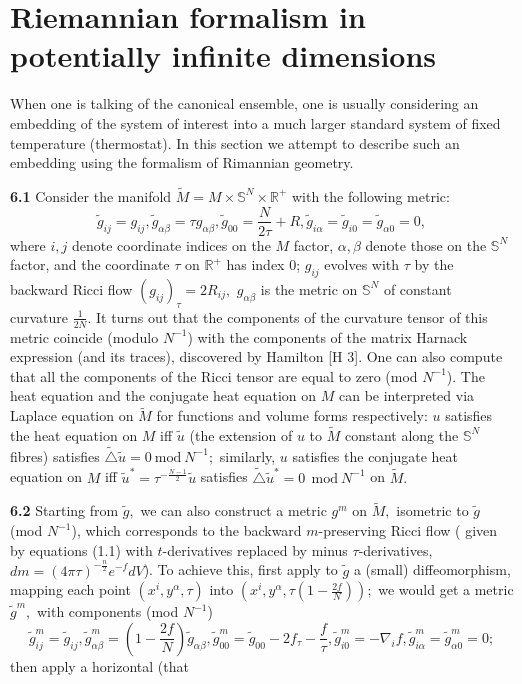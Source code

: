 \documentclass[12pt]{article}
\theoremstyle{plain}
{\swapnumbers
\newtheorem{thm}{Theorem}[section]
\newtheorem{cor}[thm]{Corollary}
\newtheorem{lem}[thm]{Lemma}
\newtheorem{prop}[thm]{Proposition}
}
\theoremstyle{definition}
{\swapnumbers
\newtheorem{defn}[thm]{Definition}
\newtheorem{nota}[thm]{Notation}
\newtheorem{parag}[thm]{}
\newtheorem*{parstr}{\addtocounter{thm}{1}\thesection.\arabic{thm}*}
\newtheorem*{intropar}{\addtocounter{thm}{1}\arabic{thm}}
}
\theoremstyle{remark} {\swapnumbers
\newtheorem{rem}[thm]{Remark}
\newtheorem{exam}[thm]{Example}
\newtheorem{lemma}[thm]{Lemma}
\newtheorem{claim}[thm]{Claim}
}
\numberwithin{equation}{section}
\begin{document}
\section { Riemannian formalism in potentially infinite
dimensions} When one is talking of the canonical ensemble, one is
usually considering an embedding of the system of interest into a
much larger standard system of fixed temperature (thermostat). In
this section we attempt to describe such an embedding using the
formalism of Rimannian geometry. \par {\bf 6.1}  Consider the
manifold $\tilde{M}=M\times\mathbb{S}^N\times\mathbb{R}^+$ with
the following metric:$$ \tilde{g}_{ij}=g_{ij},
\tilde{g}_{\alpha\beta}=\tau g_{\alpha\beta},
\tilde{g}_{00}=\frac{N}{2\tau}+R, \tilde{g}_{i\alpha}=\tilde{g}_{i
0}=\tilde{g}_{\alpha 0}=0,$$ where $i,j$ denote coordinate indices
on the $M$ factor, $\alpha,\beta$ denote those on the
$\mathbb{S}^N$ factor, and the coordinate $\tau$ on $\mathbb{R}^+$
has index $0$; $g_{ij}$ evolves with $\tau$ by the backward Ricci
flow $(g_{ij})_\tau=2R_{ij},$ $g_{\alpha\beta}$ is the metric on
$\mathbb{S}^N$ of constant curvature $\frac{1}{2N}.$ It turns out
that the components of the curvature tensor of this metric
coincide (modulo $N^{-1}$) with the components of the matrix
Harnack expression (and its traces), discovered by Hamilton [H 3].
One can also compute that all the components of the Ricci tensor
are equal to zero (mod $N^{-1}$). The heat equation and the
conjugate heat equation on $M$ can be interpreted via Laplace
equation on $\tilde{M}$ for functions and volume forms
respectively: $u$ satisfies the heat equation on $M$ iff
$\tilde{u}$ (the extension of $u$ to $\tilde{M}$ constant along
the $\mathbb{S}^N$ fibres) satisfies
$\tilde{\triangle}\tilde{u}=0\ \mbox{mod}\ N^{-1};$ similarly, $u$
satisfies the conjugate heat equation on $M$ iff
$\tilde{u}^*=\tau^{-\frac{N-1}{2}}\tilde{u}$ satisfies
$\tilde{\triangle}\tilde{u}^*=0\ \ \mbox{mod}\ N^{-1}$ on
$\tilde{M}.$ \par {\bf 6.2}  Starting from $\tilde{g},$ we can
also construct a metric $g^m$ on $\tilde{M},$ isometric to
$\tilde{g}$ (mod $N^{-1}$), which corresponds to the backward
$m$-preserving Ricci flow ( given by equations (1.1) with
$t$-derivatives replaced by minus $\tau$-derivatives,
$dm=(4\pi\tau)^{-\frac{n}{2}}e^{-f}dV$). To achieve this, first
apply to $\tilde{g}$ a (small) diffeomorphism, mapping each point
$(x^{i},y^{\alpha},\tau)$ into $
(x^{i},y^{\alpha},\tau(1-\frac{2f}{N}));$ we would get a metric
$\tilde{g}^m,$ with components (mod $N^{-1}$) $$
\tilde{g}^m_{ij}=\tilde{g}_{ij},
\tilde{g}^m_{\alpha\beta}=(1-\frac{2f}{N})\tilde{g}_{\alpha\beta},
\tilde{g}^m_{00}=\tilde{g}_{00}-2f_{\tau}-\frac{f}{\tau},
\tilde{g}^m_{i 0}=-\nabla_i f, \tilde{g}^m_{i
\alpha}=\tilde{g}^m_{\alpha 0}=0;$$ then apply a horizontal (that
\end{document}
